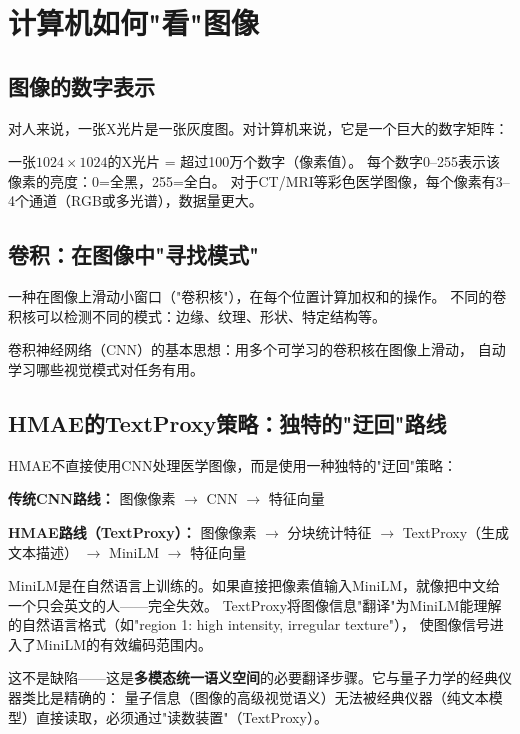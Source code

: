 \documentclass[11pt,a4paper]{ctexart}
\begin{document}
\newpage

\section{计算机如何"看"图像}

\subsection{图像的数字表示}

对人来说，一张X光片是一张灰度图。对计算机来说，它是一个巨大的数字矩阵：

\begin{exambox}[一张X光片的数字表示]
一张$1024 \times 1024$的X光片 = 超过100万个数字（像素值）。
每个数字0--255表示该像素的亮度：0=全黑，255=全白。
对于CT/MRI等彩色医学图像，每个像素有3--4个通道（RGB或多光谱），数据量更大。
\end{exambox}

\subsection{卷积：在图像中"寻找模式"}

\begin{defbox}[卷积 (Convolution)]
一种在图像上滑动小窗口（"卷积核"），在每个位置计算加权和的操作。
不同的卷积核可以检测不同的模式：边缘、纹理、形状、特定结构等。
\end{defbox}

卷积神经网络（CNN）的基本思想：用多个可学习的卷积核在图像上滑动，
自动学习哪些视觉模式对任务有用。

\subsection{HMAE的TextProxy策略：独特的"迂回"路线}

HMAE不直接使用CNN处理医学图像，而是使用一种独特的"迂回"策略：

\textbf{传统CNN路线：} 图像像素 $\to$ CNN $\to$ 特征向量

\textbf{HMAE路线（TextProxy）：} 图像像素 $\to$ 分块统计特征 $\to$ TextProxy（生成文本描述） $\to$ MiniLM $\to$ 特征向量

\begin{keybox}
MiniLM是在自然语言上训练的。如果直接把像素值输入MiniLM，就像把中文给一个只会英文的人——完全失效。
TextProxy将图像信息"翻译"为MiniLM能理解的自然语言格式（如"region 1: high intensity, irregular texture"），
使图像信号进入了MiniLM的有效编码范围内。

这不是缺陷——这是\textbf{多模态统一语义空间}的必要翻译步骤。它与量子力学的经典仪器类比是精确的：
量子信息（图像的高级视觉语义）无法被经典仪器（纯文本模型）直接读取，必须通过"读数装置"（TextProxy）。
\end{keybox}
\end{document}
